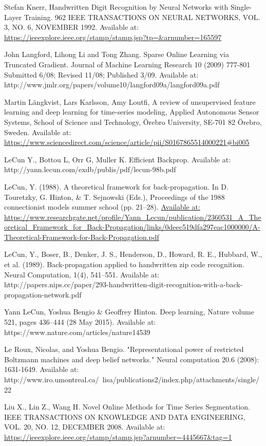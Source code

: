 \documentclass[a4paper,latin]{paper}
\begin{document}
\begin{thebibliography}{bibliography}
Stefan Knerr, Handwritten Digit Recognition by Neural Networks with Single-Layer 
Training. 962 IEEE TRANSACTIONS ON NEURAL NETWORKS, VOL. 3, NO. 6, NOVEMBER 
1992. Available at: \url{https://ieeexplore.ieee.org/stamp/stamp.jsp?tp=&arnumber=165597 }


John Langford, Lihong Li and Tong Zhang. Sparse Online Learning via Truncated 
Gradient. Journal of Machine Learning Research 10 (2009) 777-801 Submitted 6/08; Revised 11/08; Published 
3/09. Available at: http://www.jmlr.org/papers/volume10/langford09a/langford09a.pdf 

Martin Längkvist, Lars Karlsson,  Amy Loutfi, A review of unsupervised feature learning and deep learning for time-series 
modeling, Applied Autonomous Sensor Systems, School of Science and Technology, Örebro University, SE-701 82 Örebro, 
Sweden. Available at: \url{https://www.sciencedirect.com/science/article/pii/S0167865514000221#bi005}

LeCun Y., Bottou L, Orr G, Muller K. Efficient Backprop. Available at: http://yann.lecun.com/exdb/publis/pdf/lecun-98b.pdf

LeCun, Y. (1988). A theoretical framework for back-propagation. In D. Touretzky,
G. Hinton, \& T. Sejnowski (Eds.), Proceedings of the 1988 connectionist models summer school (pp. 21–28).
\url{Available at: https://www.researchgate.net/profile/Yann_Lecun/publication/2360531_A_Theoretical_Framework_for_Back-Propagation/links/0deec519dfa297eac1000000/A-Theoretical-Framework-for-Back-Propagation.pdf}

LeCun, Y., Boser, B., Denker, J. S., Henderson, D., Howard, R. E., Hubbard, W., et al.
(1989). Back-propagation applied to handwritten zip code recognition. Neural
Computation, 1(4), 541–551. Available at: http://papers.nips.cc/paper/293-handwritten-digit-recognition-with-a-back-propagation-network.pdf

Yann LeCun, Yoshua Bengio \& Geoffrey Hinton. Deep learning, Nature volume 521, pages 436–444 (28 May 
2015). Available at: https://www.nature.com/articles/nature14539

Le Roux, Nicolas, and Yoshua Bengio. "Representational power of restricted Boltzmann machines and deep belief networks." Neural computation 20.6 (2008): 1631-1649.
Available at: http://www.iro.umontreal.ca/~lisa/publications2/index.php/attachments/single/22

Liu X., Lin Z., Wang H. Novel Online Methods for Time Series Segmentation.  IEEE TRANSACTIONS ON KNOWLEDGE AND DATA ENGINEERING, VOL. 20, NO. 12, DECEMBER 
2008. Available at: \url{https://ieeexplore.ieee.org/stamp/stamp.jsp?arnumber=4445667&tag=1}


\end{thebibliography}
\end{document}
